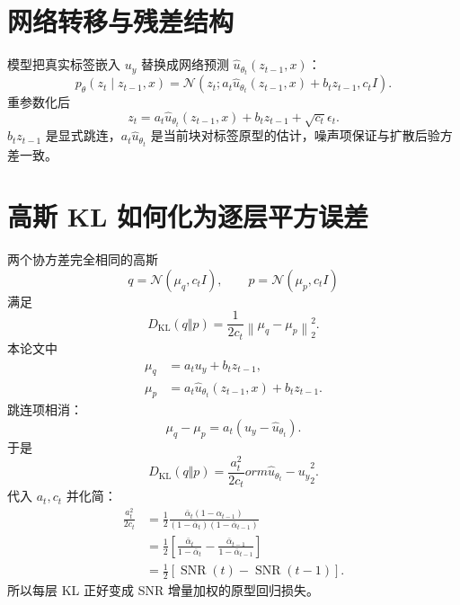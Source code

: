 \documentclass[UTF8,12pt,a4paper,fontset=none]{ctexart}
\numberwithin{equation}{section}
\newcommand{\norm}[1]{\left\lVert #1\right\rVert}
\newcommand{\KL}{D_{\mathrm{KL}}}
\begin{document}
\section{网络转移与残差结构}
模型把真实标签嵌入 $u_y$ 替换成网络预测 $\hat u_{\theta_t}(z_{t-1},x)$：
\begin{equation}
 p_\theta(z_t\mid z_{t-1},x)
 =\mathcal N\!\left(z_t;
 a_t\hat u_{\theta_t}(z_{t-1},x)+b_tz_{t-1},c_tI\right).
\end{equation}
重参数化后
\begin{equation}
 \boxed{z_t=a_t\hat u_{\theta_t}(z_{t-1},x)+b_tz_{t-1}+\sqrt{c_t}\epsilon_t.}
\end{equation}
$b_tz_{t-1}$ 是显式跳连，$a_t\hat u_{\theta_t}$ 是当前块对标签原型的估计，噪声项保证与扩散后验方差一致。

\section{高斯 KL 如何化为逐层平方误差}
两个协方差完全相同的高斯
\begin{equation}
 q=\mathcal N(\mu_q,c_tI),\qquad p=\mathcal N(\mu_p,c_tI)
\end{equation}
满足
\begin{equation}
 \KL(q\Vert p)=\frac{1}{2c_t}\norm{\mu_q-\mu_p}_2^2.
\end{equation}
本论文中
\begin{align}
 \mu_q&=a_tu_y+b_tz_{t-1},\\
 \mu_p&=a_t\hat u_{\theta_t}(z_{t-1},x)+b_tz_{t-1}.
\end{align}
跳连项相消：
\begin{equation}
 \mu_q-\mu_p=a_t\left(u_y-\hat u_{\theta_t}\right).
\end{equation}
于是
\begin{equation}
 \KL(q\Vert p)=\frac{a_t^2}{2c_t}
orm{\hat u_{\theta_t}-u_y}_2^2.
\end{equation}
代入 $a_t,c_t$ 并化简：
\begin{align}
 \frac{a_t^2}{2c_t}
 &=\frac12\frac{\bar\alpha_t(1-\alpha_{t-1})}
 {(1-\bar\alpha_t)(1-\bar\alpha_{t-1})}\\
 &=\frac12\left[
 \frac{\bar\alpha_t}{1-\bar\alpha_t}
 -\frac{\bar\alpha_{t-1}}{1-\bar\alpha_{t-1}}
 \right]\\
 &=\frac12\left[\operatorname{SNR}(t)-\operatorname{SNR}(t-1)\right].
\end{align}
所以每层 KL 正好变成 SNR 增量加权的原型回归损失。
\end{document}
